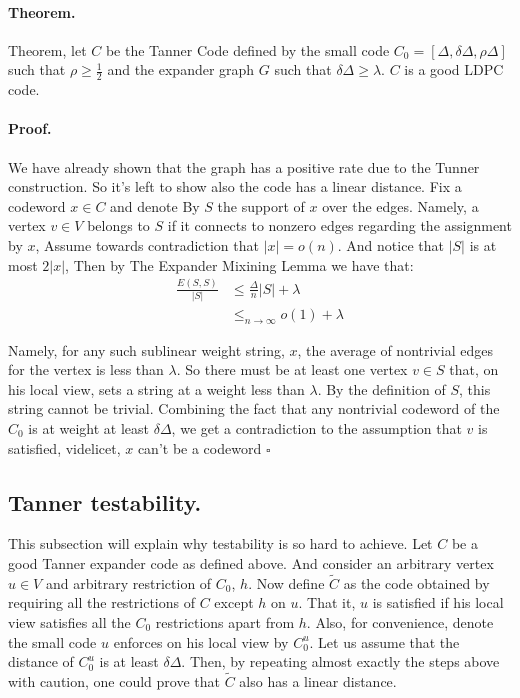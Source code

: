 \documentclass{article}
\begin{document}
\begin{multicols*}{2}
  \paragraph{Theorem.} Theorem, let $C$ be the Tanner Code defined by the small code $C_{0} = [\Delta,\delta\Delta, \rho\Delta ]$ such that $\rho \ge \frac{1}{2}$ and the expander graph $G$ such that $\delta\Delta \ge \lambda$. $C$ is a good  LDPC code.
  \paragraph{Proof.} We have already shown that the graph has a positive rate due to the Tunner construction. So it's left to show also the code has a linear distance. Fix a codeword $x \in C$ and denote By $S$ the support of $x$ over the edges. Namely, a vertex $v\in V$ belongs to $S$ if it connects to nonzero edges regarding the assignment by $x$, Assume towards contradiction that $|x| = o\left( n \right)$. And notice that $|S|$ is at most $2|x|$, Then by The Expander Mixining Lemma we have that: 
  \begin{equation*}
    \begin{split}
      \frac{E\left( S,S \right)}{|S|} & \le \frac{\Delta}{n}|S|  + \lambda \\
      & \le_{ n \rightarrow \infty} o\left( 1 \right) + \lambda
    \end{split}
  \end{equation*}

  Namely, for any such sublinear weight string, $x$, the average of nontrivial edges for the vertex is less than $\lambda$. So there must be at least one vertex $v \in S$ that, on his local view, sets a  string at a weight less than $\lambda$. By the definition of $S$, this string cannot be trivial. Combining the fact that any nontrivial codeword of the $C_{0}$ is at weight at least $\delta\Delta$, we get a contradiction to the assumption that $v$ is satisfied, videlicet, $x$ can't be a codeword $\square$
  \subsection{Tanner testability.} This subsection will explain why testability is so hard to achieve. Let $C$ be a good Tanner expander code as defined above. And consider an arbitrary vertex $u \in V$ and arbitrary restriction of $C_{0}$, $h$. Now define $\tilde{C}$ as the code obtained by requiring all the restrictions of $C$ except $h$ on $u$. That it, $u$ is satisfied if his local view satisfies all the $C_{0}$ restrictions apart from $h$.
  Also, for convenience, denote the small code $u$ enforces on his local view by $C_{0}^{u}$. Let us assume that the distance of $C_{0}^{u}$ is at least $\delta\Delta$. 
  Then, by repeating almost exactly the steps above with caution, one could prove that $\tilde{C}$ also has a linear distance. 



\end{multicols*}
\end{document}
